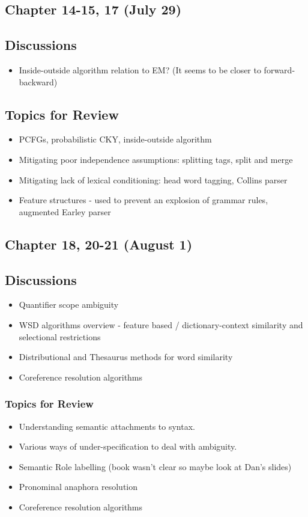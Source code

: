 \subsection{Chapter 14-15, 17 (July 29)}
\subsection*{Discussions}
\begin{itemize}
\item Inside-outside algorithm relation to EM? (It seems to be closer to forward-backward)
\end{itemize}

\subsection*{Topics for Review}
\begin{itemize}
\item PCFGs, probabilistic CKY, inside-outside algorithm
\item Mitigating poor independence assumptions: splitting tags, split and merge
\item Mitigating lack of lexical conditioning: head word tagging, Collins parser
\item Feature structures - used to prevent an explosion of grammar rules, augmented Earley parser
\end{itemize}


\subsection{Chapter 18, 20-21 (August 1)}
\subsection*{Discussions}
\begin{itemize}
\item Quantifier scope ambiguity
\item WSD algorithms overview - feature based / dictionary-context similarity and selectional restrictions
\item Distributional and Thesaurus methods for word similarity
\item Coreference resolution algorithms
\end{itemize}

\subsubsection*{Topics for Review}
\begin{itemize}
\item Understanding semantic attachments to syntax.
\item Various ways of under-specification to deal with ambiguity.
\item Semantic Role labelling (book wasn't clear so maybe look at Dan's slides)
\item Pronominal anaphora resolution
\item Coreference resolution algorithms
\end{itemize}
